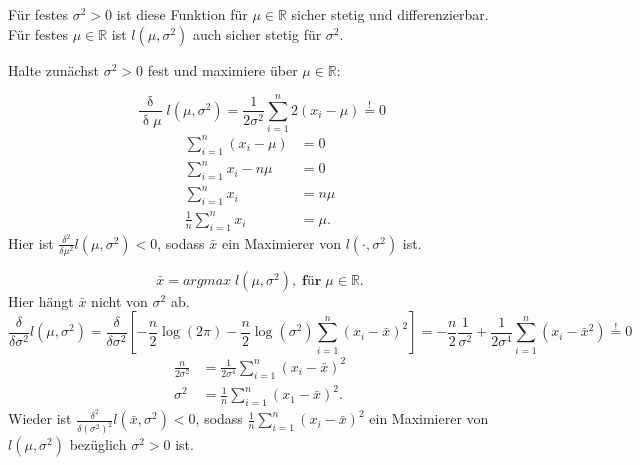 \documentclass[10pt]{article}
\newcommand{\IR}{\mathbb{R}} %
\newenvironment{BSP}[1][]
{\begin{Beispiel}[frametitle=#1]}{\end{Beispiel}}
\begin{document}
\begin{BSP}[Maximum-Likelihood]
\begin{enumerate}[label = (\roman*)]
			Für festes $\sigma^2 >0$ ist diese Funktion für $\mu \in \IR$ sicher stetig und differenzierbar. Für festes $\mu \in \IR$ ist $l(\mu, \sigma^2)$ auch sicher stetig für $\sigma^2$. 
			
			Halte zunächst $\sigma^2 >0$ fest und maximiere über $\mu \in \IR$: 
			
			\begin{equation*}
				\frac{\updelta}{\updelta \mu} l(\mu, \sigma^2) = \frac{1}{2\sigma^2} \sum_{i=1}^{n}2(x_i-\mu) \overset{!}= 0
			\end{equation*}
			\begin{equation*}
				\begin{split}
					\sum_{i=1}^{n}(x_i - \mu) &= 0\\
					\sum_{i=1}^{n}x_i - n\mu &= 0\\
					\sum_{i=1}^{n}x_i &= n\mu \\
					\frac{1}{n}\sum_{i=1}^{n}x_i &= \mu.			
				\end{split}
			\end{equation*}
			Hier ist $\frac{\delta^2}{\delta\mu^2}l(\mu, \sigma^2) <0$, sodass $\bar{x}$ ein Maximierer von $l(\cdot,\sigma^2)$ ist. 
			
			\begin{equation*}
				\bar{x} = argmax\; l(\mu, \sigma^2), \; \textbf{für} \; \mu \in \IR.
			\end{equation*}
			Hier hängt $\bar{x}$ nicht von $\sigma^2$ ab. 
			\begin{equation*}
				\frac{\delta}{\delta \sigma^2} l (\mu, \sigma^2) = \frac{\delta}{\delta \sigma^2} [-\frac{n}{2}\log(2\pi)-\frac{n}{2}\log(\sigma^2)\sum_{i=1}^{n}(x_i - \bar{x})^2] = -\frac{n}{2} \frac{1}{\sigma^2}+ \frac{1}{2\sigma^4}\sum_{i=1}^{n}(x_i-\bar{x}^2) \overset{!} = 0
			\end{equation*}
			\begin{equation*}
				\begin{split}
					\frac{n}{2\sigma^2} &= \frac{1}{2\sigma^4}\sum_{i=1}^{n}(x_i - \bar{x})^2\\
					\sigma^2 &= \frac{1}{n}\sum_{i=1}^{n}(x_1-\bar{x})^2.
				\end{split}
			\end{equation*}
			Wieder ist  $\frac{\delta^2}{\delta (\sigma^2)^2} l(\bar{x}, \sigma^2)<0$, sodass $\frac{1}{n}$$\sum_{i=1}^{n}(x_i-\bar{x})^2$ ein Maximierer von $l(\mu, \sigma^2)$ bezüglich $\sigma^2 > 0$ ist. 
			

\end{enumerate}
\end{BSP}
\end{document}
